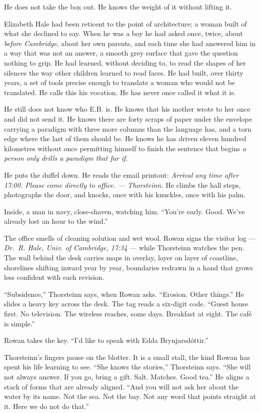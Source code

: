 \documentclass[11pt,oneside]{book}
\newcommand{\sceneline}{%
  \par\vspace{1.2em}
  \begin{center}
    \fontsize{11}{11}\selectfont \textbullet\quad\textbullet\quad\textbullet
  \end{center}
  \vspace{0.6em}\noindent\ignorespaces
}
\begin{document}
He does not take the box out. He knows the weight of it without lifting
it.

Elizabeth Hale had been reticent to the point of architecture; a woman
built of what she declined to say. When he was a boy he had asked once,
twice, about \emph{before Cambridge}, about her own parents, and each
time she had answered him in a way that was not an answer, a smooth grey
surface that gave the question nothing to grip. He had learned, without
deciding to, to read the shapes of her silences the way other children
learned to read faces. He had built, over thirty years, a set of tools
precise enough to translate a woman who would not be translated. He
calls this his vocation. He has never once called it what it is.

He still does not know who E.B. is. He knows that his mother wrote to
her once and did not send it. He knows there are forty scraps of paper
under the envelope carrying a paradigm with three more columns than the
language has, and a torn edge where the last of them should be. He knows
he has driven eleven hundred kilometres without once permitting himself
to finish the sentence that begins \emph{a person only drills a paradigm
that far if.}

He puts the duffel down. He reads the email printout: \emph{Arrival any
time after 17:00. Please come directly to office. --- Thorsteinn.} He
climbs the hall steps, photographs the door, and knocks, once with his
knuckles, once with his palm.

\sceneline

Inside, a man in navy, close-shaven, watching him. ``You're early. Good.
We've already lost an hour to the wind.''

The office smells of cleaning solution and wet wool. Rowan signs the
visitor log --- \emph{Dr.~R. Hale, Univ. of Cambridge, 17:34} --- while
Thorsteinn watches the pen. The wall behind the desk carries maps in
overlay, layer on layer of coastline, shorelines shifting inward year by
year, boundaries redrawn in a hand that grows less confident with each
revision.

``Subsidence,'' Thorsteinn says, when Rowan asks. ``Erosion. Other
things.'' He slides a heavy key across the desk. The tag reads a
six-digit code. ``Guest house first. No television. The wireless
reaches, some days. Breakfast at eight. The café is simple.''

Rowan takes the key. ``I'd like to speak with Edda Brynjarsdóttir.''

Thorsteinn's fingers pause on the blotter. It is a small stall, the kind
Rowan has spent his life learning to see. ``She knows the stories,''
Thorsteinn says. ``She will not always answer. If you go, bring a gift.
Salt. Matches. Good tea.'' He aligns a stack of forms that are already
aligned. ``And you will not ask her about the water by its name. Not the
sea. Not the bay. Not any word that points straight at it. Here we do
not do that.''
\end{document}
